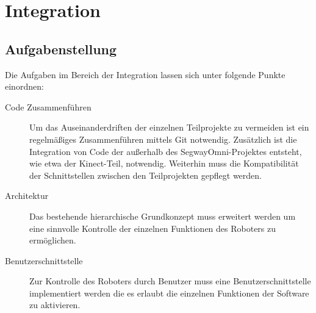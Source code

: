 
\chapter{Integration}
\label{integration_cha}
\authorsection{\editorjulian}

\section{Aufgabenstellung}
\label{aufgabenstellung_integration_sec}


Die Aufgaben im Bereich der Integration lassen sich unter folgende Punkte einordnen:

\begin{description}
\item[Code Zusammenführen]
Um das Auseinanderdriften der einzelnen Teilprojekte zu vermeiden ist ein regelmäßiges Zusammenführen 
mittels Git notwendig. Zusätzlich ist die Integration von Code der außerhalb des SegwayOmni-Projektes 
entsteht, wie etwa der Kinect-Teil, notwendig. Weiterhin muss die Kompatibilität der Schnittstellen 
zwischen den Teilprojekten gepflegt werden.

\item[Architektur]
Das bestehende hierarchische Grundkonzept muss erweitert werden um eine sinnvolle Kontrolle der 
einzelnen Funktionen des Roboters zu ermöglichen.

\item[Benutzerschnittstelle]
Zur Kontrolle des Roboters durch Benutzer muss eine Benutzerschnittstelle implementiert werden die es 
erlaubt die einzelnen Funktionen der Software zu aktivieren.

\end{description}


